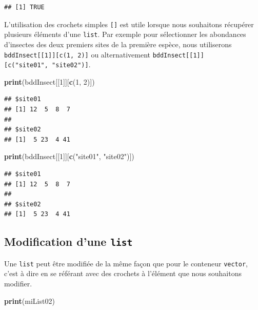 \documentclass[twoside,symmetric]{book}
\newenvironment{Shaded}{}{}
\newcommand{\DecValTok}[1]{#1}
\newcommand{\KeywordTok}[1]{\textbf{#1}}
\newcommand{\NormalTok}[1]{#1}
\newcommand{\StringTok}[1]{#1}
\begin{document}
\begin{verbatim}
## [1] TRUE
\end{verbatim}

L'utilisation des crochets simples \texttt{{[}{]}} est utile lorsque nous souhaitons récupérer plusieurs éléments d'une \texttt{list}. Par exemple pour sélectionner les abondances d'insectes des deux premiers sites de la première espèce, nous utiliserons \texttt{bddInsect{[}{[}1{]}{]}{[}c(1,\ 2){]}} ou alternativement \texttt{bddInsect{[}{[}1{]}{]}{[}c("site01",\ "site02"){]}}.

\begin{Shaded}
\begin{Highlighting}[]
\KeywordTok{print}\NormalTok{(bddInsect[[}\DecValTok{1}\NormalTok{]][}\KeywordTok{c}\NormalTok{(}\DecValTok{1}\NormalTok{, }\DecValTok{2}\NormalTok{)])}
\end{Highlighting}
\end{Shaded}

\begin{verbatim}
## $site01
## [1] 12  5  8  7
## 
## $site02
## [1]  5 23  4 41
\end{verbatim}

\begin{Shaded}
\begin{Highlighting}[]
\KeywordTok{print}\NormalTok{(bddInsect[[}\DecValTok{1}\NormalTok{]][}\KeywordTok{c}\NormalTok{(}\StringTok{"site01"}\NormalTok{, }\StringTok{"site02"}\NormalTok{)])}
\end{Highlighting}
\end{Shaded}

\begin{verbatim}
## $site01
## [1] 12  5  8  7
## 
## $site02
## [1]  5 23  4 41
\end{verbatim}

\hypertarget{modification-dune-list}{%
\subsection{\texorpdfstring{Modification d'une \texttt{list}}{Modification d'une list}}\label{modification-dune-list}}

Une \texttt{list} peut être modifiée de la même façon que pour le conteneur \texttt{vector}, c'est à dire en se référant avec des crochets à l'élément que nous souhaitons modifier.

\begin{Shaded}
\begin{Highlighting}[]
\KeywordTok{print}\NormalTok{(miList02)}
\end{Highlighting}
\end{Shaded}
\end{document}

